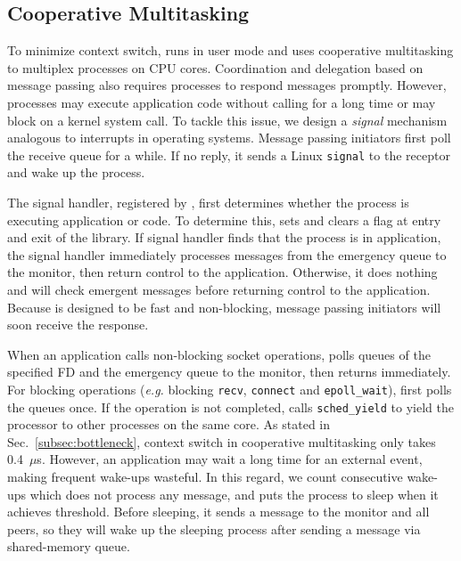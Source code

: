 

\subsection{Cooperative Multitasking}
\label{subsec:process-mux}

To minimize context switch, \sys{} runs in user mode and uses cooperative multitasking to multiplex processes on CPU cores. Coordination and delegation based on message passing also requires processes to respond messages promptly. However, processes may execute application code without calling \libipc{} for a long time or may block on a kernel system call. To tackle this issue, we design a \textit{signal} mechanism analogous to interrupts in operating systems. Message passing initiators first poll the receive queue for a while. If no reply, it sends a Linux \texttt{signal} to the receptor and wake up the process.

The signal handler, registered by \libipc{}, first determines whether the process is executing application or \libipc{} code. To determine this, \libipc{} sets and clears a flag at entry and exit of the library. If signal handler finds that the process is in application, the signal handler immediately processes messages from the emergency queue to the monitor, then return control to the application. Otherwise, it does nothing and \libipc{} will check emergent messages before returning control to the application. Because \libipc{} is designed to be fast and non-blocking, message passing initiators will soon receive the response.

When an application calls non-blocking socket operations, \libipc{} polls queues of the specified FD and the emergency queue to the monitor, then returns immediately. For blocking operations (\textit{e.g.} blocking \texttt{recv}, \texttt{connect} and \texttt{epoll\_wait}), \libipc{} first polls the queues once. If the operation is not completed, \libipc{} calls \texttt{sched\_yield} to yield the processor to other processes on the same core. As stated in Sec.~\ref{subsec:bottleneck}, context switch in cooperative multitasking only takes 0.4~$\mu$s. However, an application may wait a long time for an external event, making frequent wake-ups wasteful. In this regard, we count consecutive wake-ups which does not process any message, and puts the process to sleep when it achieves threshold. Before sleeping, it sends a message to the monitor and all peers, so they will wake up the sleeping process after sending a message via shared-memory queue.

